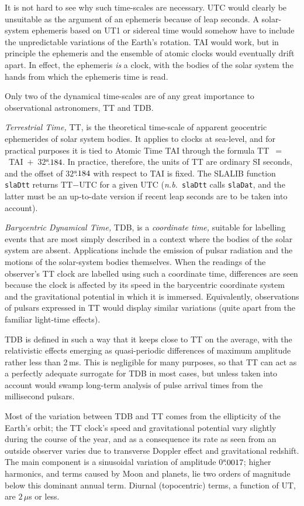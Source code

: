 \documentclass[11pt,fleqn,twoside]{article}
\renewcommand{\_}{{\tt\char'137}}     %
\newcommand{\tseci}[1]   {$#1$\mbox{$^{\rm s}$}}
\newcommand{\tsec}[2]    {\tseci{#1}$\hspace{-0.3em}.#2$}
\begin{document}
It is not hard to see why such time-scales are necessary.
UTC would clearly be unsuitable as the argument of an
ephemeris because of leap seconds.
A solar-system ephemeris based on UT1 or sidereal time would somehow
have to include the unpredictable variations of the Earth's rotation.
TAI would work, but in principle
the ephemeris and the ensemble of atomic clocks would
eventually drift apart.
In effect, the ephemeris {\it is}\/ a clock, with the bodies of
the solar system the hands from which the ephemeris time is read.
 
Only two of the dynamical time-scales are of any great importance to
observational astronomers, TT and TDB.
 
{\it Terrestrial Time,} TT, is
the theoretical time-scale of apparent geocentric ephemerides of solar
system bodies.  It applies to clocks at sea-level, and for practical purposes
it is tied to
Atomic Time TAI through the formula TT~$=$~TAI~$+$~\tsec{32}{184}.
In practice, therefore, the units of TT are ordinary SI seconds, and
the offset of \tsec{32}{184} with respect to TAI is fixed.
The SLALIB function
{\tt slaDtt}
returns TT$-$UTC for a given UTC
({\it n.b.}~{\tt slaDtt}
calls
{\tt slaDat},
and the latter must be an up-to-date version if recent leap seconds are
to be taken into account).
 
{\it Barycentric Dynamical Time,} TDB, is a
{\it coordinate time,} suitable
for labelling events that are most simply described in a context
where the bodies of the solar system
are absent.  Applications include
the emission of pulsar radiation and the motions of the
solar-system bodies themselves.  When the readings of the
observer's TT clock are labelled using such a
coordinate time, differences
are seen because the clock is affected by its
speed in the barycentric coordinate system
and the gravitational potential in which it is immersed.  Equivalently,
observations of pulsars
expressed in TT would display similar variations (quite
apart from the familiar light-time effects).

TDB is defined in such a way that it keeps close to TT
on the average, with the relativistic effects emerging as
quasi-periodic differences of maximum amplitude rather less
than 2\,ms.  This is
negligible for many purposes, so that TT can act as
a perfectly adequate surrogate for TDB in most cases,
but unless taken into
account would swamp
long-term analysis of pulse arrival times from the
millisecond pulsars.

Most of the variation between TDB and TT comes from the ellipticity of
the Earth's orbit;  the TT clock's speed and
gravitational potential vary slightly
during the course of the year, and as a consequence
its rate as seen from an outside observer
varies due to transverse Doppler effect and gravitational
redshift.  The main component is a sinusoidal variation of
amplitude \tsec{0}{0017};  higher harmonics, and terms
caused by Moon and planets, lie two orders of magnitude below
this dominant annual term.  Diurnal (topocentric) terms, a
function of UT, are $2\,\mu$s or less.
\end{document}
